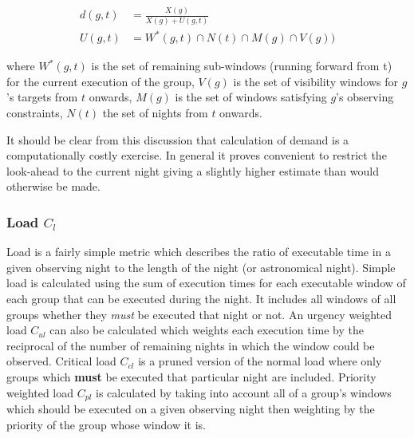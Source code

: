 \begin{align}
\label{eq:demand}
  d(g,t) &= \frac{X(g)}{X(g) + U(g,t)} \\
  U(g,t) &= W^*(g,t) \cap N(t) \cap M(g) \cap V(g))
\end{align}


where $W^*(g,t)$ is the set of remaining sub-windows (running forward from t) for the current execution of the group, $V(g)$ is the set of visibility windows for $g$'s targets from $t$ onwards, $M(g)$ is the set of windows satisfying $g$'s observing constraints, $N(t)$ the set of nights from $t$ onwards.

It should be clear from this discussion that calculation of demand is a computationally costly exercise. In general it proves convenient to restrict the look-ahead to the current night giving a slightly higher estimate than would otherwise be made.





\subsubsection{Load $C_l$}
\label{sect:metric_load}
 Load is a fairly simple metric which describes the ratio of executable time in a given observing night to the length of the night (or astronomical night). Simple load is calculated using the sum of execution times for each executable window of each group that can be executed during the night. It includes all windows of all groups whether they \emph{must} be executed that night or not. An urgency weighted load $C_{ul}$  can also be calculated which weights each execution time by the reciprocal of the number of remaining nights in which the window could be observed. Critical load $C_{cl}$ is a pruned version of the normal load where only groups which {\bf must} be executed that particular night are included. Priority weighted load $C_{pl}$ is calculated by taking into account all of a group's windows which should be executed on a given observing night then weighting by the priority of the group whose window it is.

